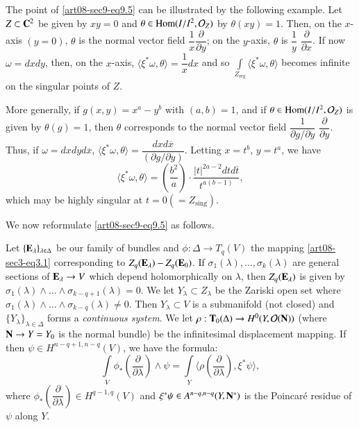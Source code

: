 \begin{example*}
The point of \eqref{art08-sec9-eq9.5} can be illustrated by the following example. Let $Z\subset \mathbf{C}^{2}$ be given by $xy=0$ and $\theta\in \operatorname{\mathrm{Hom}}(I/I^{2},\mathcal{O}_{Z})$ by $\theta(xy)=1$. Then, on the $x$-axis $(y=0)$, $\theta$ is the normal vector field $\dfrac{1}{x}\dfrac{\partial}{\partial y}$; on the $y$-axis, $\theta$ is $\dfrac{1}{y}$ $\dfrac{\partial}{\partial x}$. If now $\omega=dxdy$, then, on the $x$-axis, $\langle \xi^{*}\omega,\theta\rangle=\dfrac{1}{x}dx$ and so $\int\limits_{Z_{\text{reg}}}\langle \xi^{*}\omega,\theta\rangle$ becomes infinite on the singular points of $Z$.
\end{example*}

More generally, if $g(x,y)=x^{a}-y^{b}$ with $(a,b)=1$, and if $\theta\in \operatorname{\mathrm{Hom}}(I/I^{2},\mathcal{O}_{Z})$ is given by $\theta(g)=1$, then $\theta$ corresponds to the normal vector field $\dfrac{1}{\partial g/\partial y}$ $\dfrac{\partial}{\partial y}$. Thus, if $\omega = dxdyd\overline{x}$, $\langle \xi^{*}\omega,\theta\rangle=\dfrac{dxd\overline{x}}{(\partial g/\partial y)}$. Letting $x=t^{b}$, $y=t^{a}$, we have
$$
\langle \xi^{*}\omega,\theta\rangle =\left(\dfrac{b^{2}}{a}\right)\cdot \dfrac{|t|^{2a-2}dtd\overline{t}}{t^{a(b-1)}},
$$\pageoriginale
which may be highly singular at $t=0(=Z_{\text{sing}})$.

We now reformulate \eqref{art08-sec9-eq9.5} as follows.

Let $\{\mathbf{E}_{\lambda}\}_{\lambda\in \Delta}$ be our family of bundles and $\phi:\Delta\to T_{q}(V)$ the mapping \eqref{art08-sec3-eq3.1} corresponding to $Z_{q}(\mathbf{E}_{\lambda})-Z_{q}(\mathbf{E}_{0})$. If $\sigma_{1}(\lambda),\ldots,\sigma_{k}(\lambda)$ are general sections of $\mathbf{E}_{\lambda}\to V$ which depend holomorphically on $\lambda$, then $Z_{q}(\mathbf{E}_{\lambda})$ is given by $\sigma_{1}(\lambda)\wedge\ldots\wedge \sigma_{k-q+1}(\lambda)=0$. We let $Y_{\lambda}\subset Z_{\lambda}$ be the Zariski open set where $\sigma_{1}(\lambda)\wedge\ldots\wedge \sigma_{k-q}(\lambda)\neq 0$. Then $Y_{\lambda}\subset V$ is a submanifold (not closed) and $\{Y_{\lambda}\}_{\lambda\in \Delta}$ forms a {\em continuous system}. We let $\rho:\mathbf{T}_{0}(\Delta)\to H^{0}(Y,\mathcal{O}(\mathbf{N}))$ (where $\mathbf{N}\to Y=Y_{0}$ is the normal bundle) be the infinitesimal displacement mapping. If then $\psi\in H^{n-q+1,n-q}(V)$, we have the formula:
\setcounter{equation}{7}
\begin{equation}
\int\limits_{V}\phi_{*}\left(\dfrac{\partial}{\partial\lambda}\right)\wedge\psi=\int\limits_{Y}\langle \rho\left(\dfrac{\partial}{\partial\lambda}\right),\xi^{*}\psi\rangle,\label{art08-sec9-eq9.8}
\end{equation}
where $\phi_{*}\left(\dfrac{\partial}{\partial\lambda}\right)\in H^{q-1,q}(V)$ and $\xi^{*}\psi\in A^{n-q,n-q}(Y,\mathbf{N}^{*})$ is the Poincar\'e residue of $\psi$ along $Y$.

